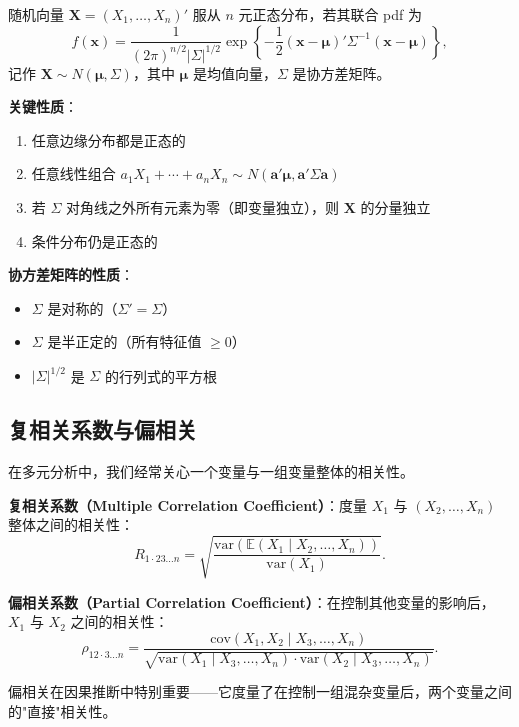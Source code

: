 \begin{definition}[$n$ 元正态分布]\label{def:multivariate-normal-ch2}
随机向量 $\mathbf{X} = (X_1, \ldots, X_n)'$ 服从 $n$ 元正态分布，若其联合 pdf 为
\[
f(\mathbf{x}) = \frac{1}{(2\pi)^{n/2} |\Sigma|^{1/2}} \exp\left\{ -\frac{1}{2} (\mathbf{x} - \boldsymbol{\mu})' \Sigma^{-1} (\mathbf{x} - \boldsymbol{\mu}) \right\},
\]
记作 $\mathbf{X} \sim N(\boldsymbol{\mu}, \Sigma)$，其中 $\boldsymbol{\mu}$ 是均值向量，$\Sigma$ 是协方差矩阵。
\end{definition}

\textbf{关键性质}：
\begin{enumerate}
\item 任意边缘分布都是正态的
\item 任意线性组合 $a_1 X_1 + \cdots + a_n X_n \sim N(\mathbf{a}'\boldsymbol{\mu}, \mathbf{a}'\Sigma\mathbf{a})$
\item 若 $\Sigma$ 对角线之外所有元素为零（即变量独立），则 $\mathbf{X}$ 的分量独立
\item 条件分布仍是正态的
\end{enumerate}

\textbf{协方差矩阵的性质}：
\begin{itemize}
\item $\Sigma$ 是对称的（$\Sigma' = \Sigma$）
\item $\Sigma$ 是半正定的（所有特征值 $\geq 0$）
\item $|\Sigma|^{1/2}$ 是 $\Sigma$ 的行列式的平方根
\end{itemize}

\subsection{复相关系数与偏相关}

在多元分析中，我们经常关心一个变量与一组变量整体的相关性。

\textbf{复相关系数（Multiple Correlation Coefficient）}：度量 $X_1$ 与 $(X_2, \ldots, X_n)$ 整体之间的相关性：
\[
R_{1\cdot 23\ldots n} = \sqrt{\frac{\text{var}(\mathbb{E}(X_1 \mid X_2, \ldots, X_n))}{\text{var}(X_1)}}.
\]

\textbf{偏相关系数（Partial Correlation Coefficient）}：在控制其他变量的影响后，$X_1$ 与 $X_2$ 之间的相关性：
\[
\rho_{12\cdot 3\ldots n} = \frac{\text{cov}(X_1, X_2 \mid X_3, \ldots, X_n)}{\sqrt{\text{var}(X_1 \mid X_3, \ldots, X_n) \cdot \text{var}(X_2 \mid X_3, \ldots, X_n)}}.
\]

偏相关在因果推断中特别重要——它度量了在控制一组混杂变量后，两个变量之间的"直接"相关性。

